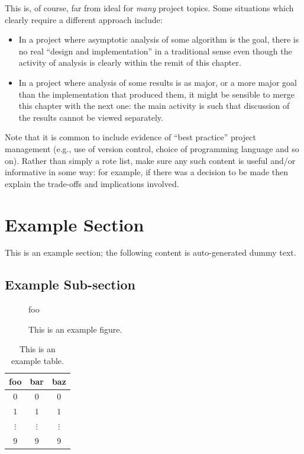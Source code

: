\documentclass[ %
                    author={Jonathan Rankin},
                supervisor={Dr. David May, Dr. Ian Holyer},
                    degree={MEng},
                     title={CodeTouch},
                  subtitle={A Revolutionary Way To Program Real Code On Touch Screen Devices},
                      type={enterprise},
                      year={2015 } ]{dissertation}
\begin{document}
This is, of course, far from ideal for {\em many} project topics.  Some
situations which clearly require a different approach include:

\begin{itemize}
\item In a project where asymptotic analysis of some algorithm is the goal,
      there is no real ``design and implementation'' in a traditional sense
      even though the activity of analysis is clearly within the remit of
      this chapter.
\item In a project where analysis of some results is as major, or a more
      major goal than the implementation that produced them, it might be
      sensible to merge this chapter with the next one: the main activity 
      is such that discussion of the results cannot be viewed separately.
\end{itemize}

\noindent
Note that it is common to include evidence of ``best practice'' project 
management (e.g., use of version control, choice of programming language 
and so on).  Rather than simply a rote list, make sure any such content 
is useful and/or informative in some way: for example, if there was a 
decision to be made then explain the trade-offs and implications 
involved.

\section{Example Section}

This is an example section; 
the following content is auto-generated dummy text.
\lipsum

\subsection{Example Sub-section}

\begin{figure}[t]
\centering
foo
\caption{This is an example figure.}
\label{fig}
\end{figure}

\begin{table}[t]
\centering
\begin{tabular}{|cc|c|}
\hline
foo      & bar      & baz      \\
\hline
$0     $ & $0     $ & $0     $ \\
$1     $ & $1     $ & $1     $ \\
$\vdots$ & $\vdots$ & $\vdots$ \\
$9     $ & $9     $ & $9     $ \\
\hline
\end{tabular}
\caption{This is an example table.}
\label{tab}
\end{table}
\end{document}
